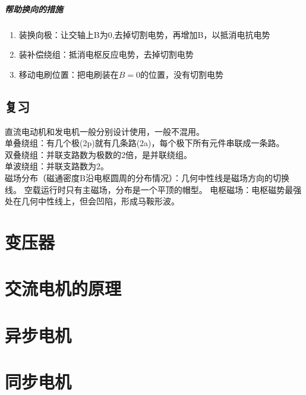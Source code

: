 \documentclass{book}
\begin{document}
    \paragraph{帮助换向的措施}
    \begin{enumerate}
        \item 装换向极：让交轴上B为0,去掉切割电势，再增加B，以抵消电抗电势
        \item 装补偿绕组：抵消电枢反应电势，去掉切割电势
        \item 移动电刷位置：把电刷装在$B=0$的位置，没有切割电势
    \end{enumerate}


    \section{复习}
    直流电动机和发电机一般分别设计使用，一般不混用。\\
    单叠绕组：有几个极(2p)就有几条路(2a)，每个极下所有元件串联成一条路。\\
    双叠绕组：并联支路数为极数的2倍，是并联绕组。\\
    单波绕组：并联支路数为2。\\
    磁场分布（磁通密度B沿电枢圆周的分布情况）：几何中性线是磁场方向的切换线。
    空载运行时只有主磁场，分布是一个平顶的帽型。
    电枢磁场：电枢磁势最强处在几何中性线上，但会凹陷，形成马鞍形波。


    \chapter{变压器}


    \chapter{交流电机的原理}


    \chapter{异步电机}


    \chapter{同步电机}


%    
%    
\end{document}
